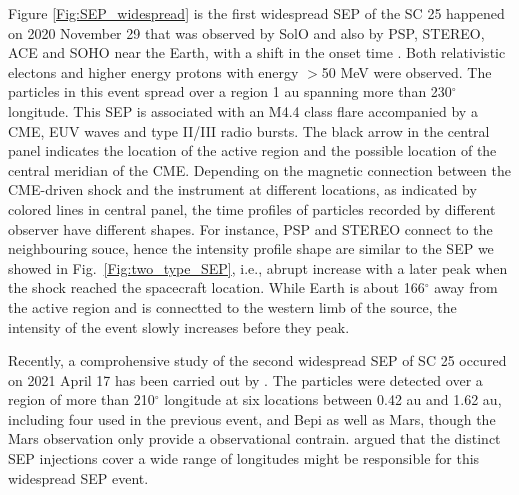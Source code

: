 Figure \ref{Fig:SEP_widespread} is the first widespread \ac{SEP} of the \ac{SC} 25 happened on 2020 November 29 that was observed by \ac{SolO} and also by \ac{PSP}, \ac{STEREO}, \ac{ACE} and \ac{SOHO} near the Earth, with a shift in the onset time \citep{Kolhoff2021AA, Kouloumvakos2022AA, Palmerio2022SpWea}. Both relativistic electons and higher energy protons with energy $>$50 MeV were observed. The particles in this event spread over a region 1 au spanning more than 230$^\circ$ longitude. This SEP is associated with an M4.4 class flare accompanied by a \ac{CME}, \ac{EUV} waves and type II/III radio bursts. The black arrow in the central panel indicates the location of the active region and the possible location of the central meridian of the \ac{CME}.  Depending on the magnetic connection between the \ac{CME}-driven shock and the instrument at different locations, as indicated by colored lines in central panel, the time profiles of particles recorded by different observer have different shapes. For instance, \ac{PSP} and \ac{STEREO} connect to the neighbouring souce, hence the intensity profile shape are similar to the \ac{SEP} we showed in Fig.~\ref{Fig:two_type_SEP}, i.e., abrupt increase with a later peak when the shock reached the spacecraft location. While Earth is about 166$^\circ$ away from the active region and is connectted to the western limb of the source, the intensity of the event slowly increases before they peak.

Recently, a comprohensive study of the second widespread \ac{SEP} of \ac{SC} 25 occured on 2021 April 17 has been carried out by \citet{Dresing2023The17}. The particles were detected over a region of more than 210$^\circ$ longitude at six locations between 0.42 au and 1.62 au, including four used in the previous event, and \ac{Bepi} as well as Mars, though the Mars observation only provide a observational contrain. \citet{Dresing2023The17} argued that the distinct SEP injections cover a wide range of longitudes might be responsible for this widespread SEP event.

